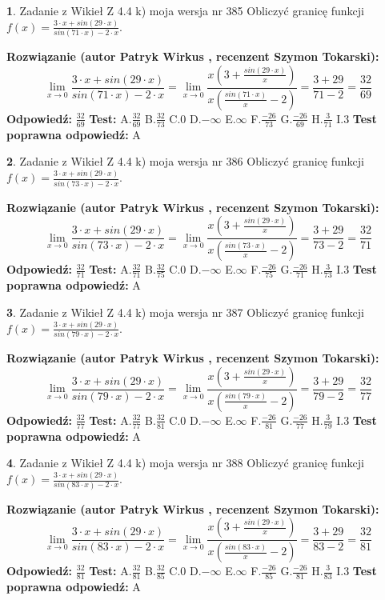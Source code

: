\documentclass[12pt, a4paper]{article}
\theoremstyle{definition} %
\newtheorem{zad}{}
\newcommand{\zadStart}[1]{\begin{zad}#1\newline}
\newcommand{\zadStop}{\end{zad}}
\newcommand{\rozwStart}[2]{\noindent \textbf{Rozwiązanie (autor #1 , recenzent #2): }\newline}
\newcommand{\rozwStop}{\newline}
\newcommand{\odpStart}{\noindent \textbf{Odpowiedź:}\newline}
\newcommand{\odpStop}{\newline}
\newcommand{\testStart}{\noindent \textbf{Test:}\newline}
\newcommand{\testStop}{\newline}
\newcommand{\kluczStart}{\noindent \textbf{Test poprawna odpowiedź:}\newline}
\newcommand{\kluczStop}{\newline}
\begin{document}
\zadStart{Zadanie z Wikieł Z 4.4 k) moja wersja nr 385}
Obliczyć granicę funkcji $f(x)=\frac{3\cdot x +sin(29\cdot x)}{sin(71\cdot x) -2\cdot x}$.
\zadStop
\rozwStart{Patryk Wirkus}{Szymon Tokarski}
$$\lim\limits_{x\to 0}\frac{3\cdot x +sin(29\cdot x)}{sin(71\cdot x) -2\cdot x}
=\lim\limits_{x\to 0}\frac{x(3+\frac{sin(29\cdot x)}{x})}{x(\frac{sin(71\cdot x)}{x}-2)}
=\frac{3+29}{71-2} = \frac{32}{69}$$
\rozwStop
\odpStart
$\frac{32}{69}$
\odpStop
\testStart
A.$\frac{32}{69}$
B.$\frac{32}{73}$
C.$0$
D.$-\infty$
E.$\infty$
F.$\frac{-26}{73}$
G.$\frac{-26}{69}$
H.$\frac{3}{71}$
I.$3$
\testStop
\kluczStart
A
\kluczStop



\zadStart{Zadanie z Wikieł Z 4.4 k) moja wersja nr 386}
Obliczyć granicę funkcji $f(x)=\frac{3\cdot x +sin(29\cdot x)}{sin(73\cdot x) -2\cdot x}$.
\zadStop
\rozwStart{Patryk Wirkus}{Szymon Tokarski}
$$\lim\limits_{x\to 0}\frac{3\cdot x +sin(29\cdot x)}{sin(73\cdot x) -2\cdot x}
=\lim\limits_{x\to 0}\frac{x(3+\frac{sin(29\cdot x)}{x})}{x(\frac{sin(73\cdot x)}{x}-2)}
=\frac{3+29}{73-2} = \frac{32}{71}$$
\rozwStop
\odpStart
$\frac{32}{71}$
\odpStop
\testStart
A.$\frac{32}{71}$
B.$\frac{32}{75}$
C.$0$
D.$-\infty$
E.$\infty$
F.$\frac{-26}{75}$
G.$\frac{-26}{71}$
H.$\frac{3}{73}$
I.$3$
\testStop
\kluczStart
A
\kluczStop



\zadStart{Zadanie z Wikieł Z 4.4 k) moja wersja nr 387}
Obliczyć granicę funkcji $f(x)=\frac{3\cdot x +sin(29\cdot x)}{sin(79\cdot x) -2\cdot x}$.
\zadStop
\rozwStart{Patryk Wirkus}{Szymon Tokarski}
$$\lim\limits_{x\to 0}\frac{3\cdot x +sin(29\cdot x)}{sin(79\cdot x) -2\cdot x}
=\lim\limits_{x\to 0}\frac{x(3+\frac{sin(29\cdot x)}{x})}{x(\frac{sin(79\cdot x)}{x}-2)}
=\frac{3+29}{79-2} = \frac{32}{77}$$
\rozwStop
\odpStart
$\frac{32}{77}$
\odpStop
\testStart
A.$\frac{32}{77}$
B.$\frac{32}{81}$
C.$0$
D.$-\infty$
E.$\infty$
F.$\frac{-26}{81}$
G.$\frac{-26}{77}$
H.$\frac{3}{79}$
I.$3$
\testStop
\kluczStart
A
\kluczStop



\zadStart{Zadanie z Wikieł Z 4.4 k) moja wersja nr 388}
Obliczyć granicę funkcji $f(x)=\frac{3\cdot x +sin(29\cdot x)}{sin(83\cdot x) -2\cdot x}$.
\zadStop
\rozwStart{Patryk Wirkus}{Szymon Tokarski}
$$\lim\limits_{x\to 0}\frac{3\cdot x +sin(29\cdot x)}{sin(83\cdot x) -2\cdot x}
=\lim\limits_{x\to 0}\frac{x(3+\frac{sin(29\cdot x)}{x})}{x(\frac{sin(83\cdot x)}{x}-2)}
=\frac{3+29}{83-2} = \frac{32}{81}$$
\rozwStop
\odpStart
$\frac{32}{81}$
\odpStop
\testStart
A.$\frac{32}{81}$
B.$\frac{32}{85}$
C.$0$
D.$-\infty$
E.$\infty$
F.$\frac{-26}{85}$
G.$\frac{-26}{81}$
H.$\frac{3}{83}$
I.$3$
\testStop
\kluczStart
A
\kluczStop
\end{document}
